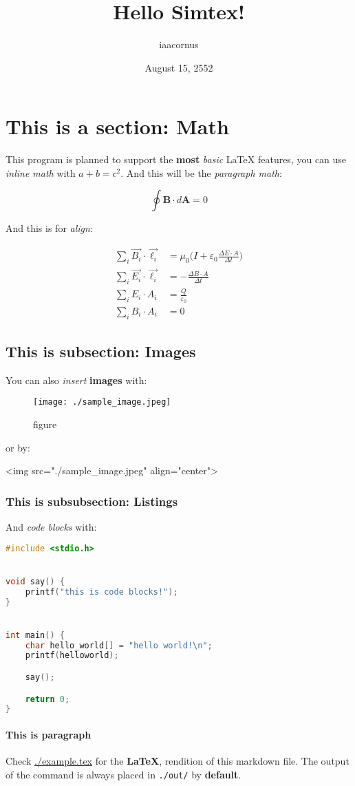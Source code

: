 \documentclass[12pt]{article}
\title{Hello Simtex!}
\author{iaacornus}
\date{August 15, 2552}
\begin{document}
	\maketitle
	
	\section{This is a section: Math}
	
	This program is planned to support the \textbf{most} \textit{basic} LaTeX features, you can use \emph{inline math} with $a + b = c^2$. And this will be the \emph{paragraph math}:
	
	\begin{equation}
		\oint \boldsymbol{B} \cdot d \boldsymbol{A} = 0
	\end{equation}
	
	And this is for \emph{align}:
	
	\begin{align}
		\sum_{i} \vec{B_{i}} \cdot \vec{\ell_{i}} &= \mu_{0} \bigg(I + \varepsilon_{0} \frac{\Delta E \cdot A}{\Delta t} \bigg)\\
		\sum_{i} \vec{E_{i}} \cdot \vec{\ell_{i}} &= - \frac{\Delta B \cdot A}{\Delta t}\\
		\sum_{i} E_{i} \cdot A_{i} &= \frac{Q}{\varepsilon_{0}}\\
		\sum_{i} B_{i} \cdot A_{i} &= 0
	\end{align}
	
	\subsection{This is subsection: Images}
	
	You can also \textit{insert} \textbf{images} with:
	
	\begin{figure}[h]
		\texttt{[image: ./sample\_image.jpeg]}
		\caption{figure}
	\end{figure}
	
	or by:
	
	
	<img src="./sample\_image.jpeg" align="center">
	
	
	\subsubsection{This is subsubsection: Listings}
	
	And \emph{code blocks} with:
	
	
\begin{lstlisting}[language=C]
#include <stdio.h>


void say() {
    printf("this is code blocks!");
}


int main() {
    char hello_world[] = "hello world!\n";
    printf(helloworld);

    say();

    return 0;
}
\end{lstlisting}
	
	\paragraph{This is paragraph}
	
	Check \href{example.tex}{./example.tex} for the \textbf{LaTeX}, rendition of this markdown file. The output of the command is always placed in \texttt{./out/} by \textbf{default}.
	
\end{document}
